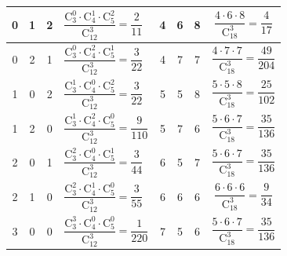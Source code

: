 \begin{bt}
{\begin{center}
{\begin{tabular}{|lll|l|ccc|c|}
	 \hline
	\multicolumn{1}{|c|}{0} & \multicolumn{1}{|c|}{1} & \multicolumn{1}{|c|}{2} & $\dfrac{\mathrm{C}_3^{0} \cdot \mathrm{C}_4^{1} \cdot \mathrm{C}_5^{2}}{\mathrm{C}_{12}^{3}}=\dfrac{2}{11}$ & \multicolumn{1}{|c|}{4} & \multicolumn{1}{|c|}{6}  & \multicolumn{1}{|c|}{8} & $\dfrac{4\cdot6\cdot8}{\mathrm{C}_{18}^{3}}=\dfrac{4}{17}$ \\
	\hline 
	\multicolumn{1}{|c|}{0} & \multicolumn{1}{|c|}{2}  & \multicolumn{1}{|c|}{1} & $\dfrac{\mathrm{C}_3^0 \cdot \mathrm{C}_4^2 \cdot \mathrm{C}_5^1}{\mathrm{C}_{12}^3}=\dfrac{3}{22}$ & \multicolumn{1}{|c|}{4} & \multicolumn{1}{|c|}{7} & \multicolumn{1}{|c|}{7} & $\dfrac{4\cdot7\cdot 7}{\mathrm{C}_{18}^3} =\dfrac{49}{204}$ \\
	 \hline
	\multicolumn{1}{|c|}{1} & \multicolumn{1}{|c|}{0}  & \multicolumn{1}{|c|}{2} & $\dfrac{\mathrm{C}_3^1 \cdot \mathrm{C}_4^0 \cdot \mathrm{C}_5^2}{\mathrm{C}_{12}^3}=\dfrac{3}{22}$ & \multicolumn{1}{|c|}{5} & \multicolumn{1}{|c|}{5} & \multicolumn{1}{|c|}{8} & $\dfrac{5\cdot5\cdot8}{\mathrm{C}_{18}^3}=\dfrac{25}{102}$ \\
	\hline 
	\multicolumn{1}{|c|}{1} & \multicolumn{1}{|c|}{2} & \multicolumn{1}{|c|}{0} & $\dfrac{\mathrm{C}_3^1 \cdot \mathrm{C}_4^2 \cdot \mathrm{C}_5^0}{\mathrm{C}_{12}^3}=\dfrac{9}{110}$ & \multicolumn{1}{|c|}{5} & \multicolumn{1}{|c|}{7} &  \multicolumn{1}{|c|}{6} & $\dfrac{5\cdot6\cdot7}{\mathrm{C}_{18}^3}=\dfrac{35}{136}$ \\
	\hline 
	\multicolumn{1}{|c|}{2} & \multicolumn{1}{|c|}{0} & \multicolumn{1}{|c|}{1} & $\dfrac{\mathrm{C}_3^2  \cdot \mathrm{C}_4^0 \cdot \mathrm{C}_5^1}{\mathrm{C}_{12}^3}=\dfrac{3}{44}$ & \multicolumn{1}{|c|}{6} & \multicolumn{1}{|c|}{5} & \multicolumn{1}{|c|}{7} & $\dfrac{5\cdot6\cdot7}{\mathrm{C}_{18}^3}=\dfrac{35}{136}$ \\
	\hline 
	\multicolumn{1}{|c|}{2} & \multicolumn{1}{|c|}{1} &  \multicolumn{1}{|c|}{0} & $\dfrac{\mathrm{C}_3^2 \cdot \mathrm{C}_4^1 \cdot \mathrm{C}_5^0}{\mathrm{C}_{12}^3}=\dfrac{3}{55}$ & \multicolumn{1}{|c|}{6} & \multicolumn{1}{|c|}{6} & \multicolumn{1}{|c|}{6} & $\dfrac{6\cdot6\cdot6}{\mathrm{C}_{18}^3}=\dfrac{9}{34}$ \\
	 \hline
	\multicolumn{1}{|c|}{3} & \multicolumn{1}{|c|}{0} & \multicolumn{1}{|c|}{0} & $\dfrac{\mathrm{C}_3^3 \cdot \mathrm{C}_4^0 \cdot \mathrm{C}_5^0}{\mathrm{C}_{12}^3}=\dfrac{1}{220}$ & \multicolumn{1}{|c|}{7} & \multicolumn{1}{|c|}{5} & \multicolumn{1}{|c|}{6} &  $\dfrac{5\cdot6\cdot7}{\mathrm{C}_{18}^3}=\dfrac{35}{136}$ \\

\end{tabular}}
\end{center}}
\end{bt}
